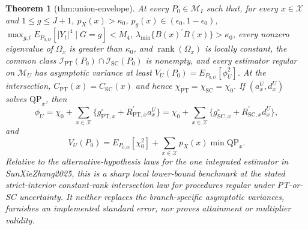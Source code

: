 \documentclass{article}
\newtheorem{theorem}{Theorem}
\begin{document}
\begin{theorem}[thm:union-envelope]\label{thm:union-envelope}
At every \(P_0\in\mathcal M_I\) such that, for every \(x\in\mathcal X\) and \(1\le g\le J+1\), \(p_X(x)>\kappa_0\), \(p_g(x)\in(\epsilon_0,1-\epsilon_0)\), \(\max_{g,t}E_{P_{0,O}}[|Y_t|^4\mid G=g]<M_4\), \(\lambda_{\min}\{B(x)^{\prime}B(x)\}>\kappa_0\), every nonzero eigenvalue of \(\Omega_x\) is greater than \(\kappa_0\), and \(\operatorname{rank}(\Omega_x)\) is locally constant, the common class \(\mathcal I_{\mathrm{PT}}(P_0)\cap\mathcal I_{\mathrm{SC}}(P_0)\) is nonempty, and every estimator regular on \(\mathcal M_U\) has asymptotic variance at least \(V_U(P_0)=E_{P_{0,O}}[\phi_U^2]\). At the intersection, \(C_{\mathrm{PT}}(x)=C_{\mathrm{SC}}(x)\) and hence \(\chi_{\mathrm{PT}}=\chi_{\mathrm{SC}}=\chi_0\). If \((a_x^U,d_x^U)\) solves \(\mathrm{QP}_x\), then \[\phi_U=\chi_0+\sum_{x\in\mathcal X}\{g^{\circ}_{\mathrm{PT},x}+R_{\mathrm{PT},x}^{\prime}a_x^U\}=\chi_0+\sum_{x\in\mathcal X}\{g^{\circ}_{\mathrm{SC},x}+R_{\mathrm{SC},x}^{\prime}d_x^U\},\] and \[V_U(P_0)=E_{P_{0,O}}[\chi_0^2]+\sum_{x\in\mathcal X}p_X(x)\min\mathrm{QP}_x.\] Relative to the alternative-hypothesis laws for the one integrated estimator in SunXieZhang2025, this is a sharp local lower-bound benchmark at the stated strict-interior constant-rank intersection law for procedures regular under PT-or-SC uncertainty. It neither replaces the branch-specific asymptotic variances, furnishes an implemented standard error, nor proves attainment or multiplier validity.
\end{theorem}
\end{document}
